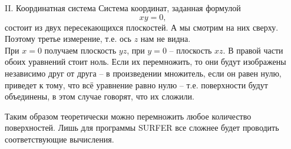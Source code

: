 \begin{surferPage}{II. Координатная система}
   Система координат, заданная формулой \[xy=0,\] состоит из двух пересекающихся плоскостей. А мы смотрим на них сверху. Поэтому третье измерение, т.е. ось $z$ нам не видна.\\
\vspace{0.3cm}
При $x=0$ получаем плоскость $yz$, при $y=0$ -- плоскость $xz$. В правой части обоих уравнений стоит ноль. Если их перемножить, то они будут изображены независимо друг от друга – в произведении множитель, если он равен нулю, приведет к тому, что всё уравнение равно нулю – т.е. поверхности будут объединены, в этом случае говорят, что их сложили.

Таким образом теоретически можно перемножить любое количество поверхностей. Лишь для программы SURFER все сложнее будет проводить соответствующие вычисления.
\end{surferPage}
